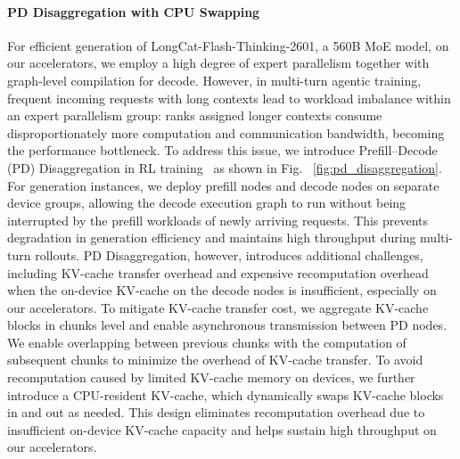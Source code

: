 \documentclass{article}
\newcommand{\longcat}{LongCat-Flash-Thinking-2601\xspace}
\begin{document}
\paragraph{PD Disaggregation with CPU Swapping} For efficient generation of \longcat, a 560B MoE model, on our accelerators, we employ a high degree of expert parallelism together with graph-level compilation for decode. However, in multi-turn agentic training, frequent incoming requests with long contexts lead to workload imbalance within an expert parallelism group: ranks assigned longer contexts consume disproportionately more computation and communication bandwidth, becoming the performance bottleneck. To address this issue, we introduce Prefill–Decode (PD) Disaggregation in RL training~\citep{zhong2024distserve,qin2024mooncake} as shown in Fig. ~\ref{fig:pd_disaggregation}. For generation instances, we deploy prefill nodes and decode nodes on separate device groups, allowing the decode execution graph to run without being interrupted by the prefill workloads of newly arriving requests. This prevents degradation in generation efficiency and maintains high throughput during multi-turn rollouts. PD Disaggregation, however, introduces additional challenges, including KV-cache transfer overhead and expensive recomputation overhead when the on-device KV-cache on the decode nodes is insufficient, especially on our accelerators. To mitigate KV-cache transfer cost, we aggregate KV-cache blocks in chunks level and enable asynchronous transmission between PD nodes. We enable overlapping between previous chunks with the computation of subsequent chunks to minimize the overhead of KV-cache transfer. To avoid recomputation caused by limited KV-cache memory on devices, we further introduce a CPU-resident KV-cache, which dynamically swaps KV-cache blocks in and out as needed. This design eliminates recomputation overhead due to insufficient on-device KV-cache capacity and helps sustain high throughput on our accelerators.
\end{document}
